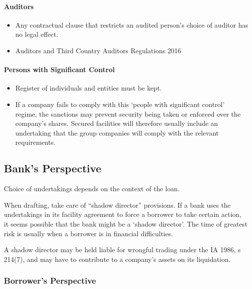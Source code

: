 \documentclass[
]{article}
\providecommand{\tightlist}{%
  \setlength{\itemsep}{0pt}\setlength{\parskip}{0pt}}
\begin{document}
\hypertarget{auditors}{%
\paragraph{Auditors}\label{auditors}}

\begin{itemize}
\tightlist
\item
  Any contractual clause that restricts an audited person's choice of
  auditor has no legal effect.
\item
  Auditors and Third Country Auditors Regulations 2016
\end{itemize}

\hypertarget{persons-with-significant-control}{%
\paragraph{Persons with Significant
Control}\label{persons-with-significant-control}}

\begin{itemize}
\tightlist
\item
  Register of individuals and entities must be kept.
\item
  If a company fails to comply with this `people with significant
  control' regime, the sanctions may prevent security being taken or
  enforced over the company's shares. Secured facilities will therefore
  usually include an undertaking that the group companies will comply
  with the relevant requirements.
\end{itemize}

\hypertarget{banks-perspective-1}{%
\subsection{Bank's Perspective}\label{banks-perspective-1}}

Choice of undertakings depends on the context of the loan.

When drafting, take care of ``shadow director'' provisions. If a bank
uses the undertakings in its facility agreement to force a borrower to
take certain action, it seems possible that the bank might be a `shadow
director'. The time of greatest risk is usually when a borrower is in
financial difficulties.

A shadow director may be held liable for wrongful trading under the IA
1986, s 214(7), and may have to contribute to a company's assets on its
liquidation.

\hypertarget{borrowers-perspective-1}{%
\subsubsection{Borrower's Perspective}\label{borrowers-perspective-1}}
\end{document}
